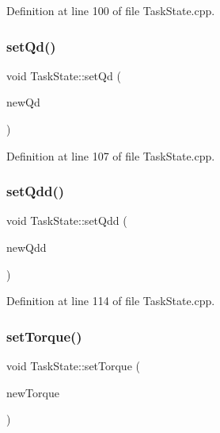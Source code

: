 Definition at line 100 of file Task\+State.\+cpp.

\hypertarget{classocra_1_1TaskState_a69d8a03ebd5c2c41e8108ff4b845ae49}{}\label{classocra_1_1TaskState_a69d8a03ebd5c2c41e8108ff4b845ae49} 
\subsubsection{\texorpdfstring{set\+Qd()}{setQd()}}
{\footnotesize\ttfamily void Task\+State\+::set\+Qd (\begin{DoxyParamCaption}\item[{const Eigen\+::\+Vector\+Xd \&}]{new\+Qd }\end{DoxyParamCaption})}



Definition at line 107 of file Task\+State.\+cpp.

\hypertarget{classocra_1_1TaskState_aa5e16bbe025ef970a18a12e0fe841c80}{}\label{classocra_1_1TaskState_aa5e16bbe025ef970a18a12e0fe841c80} 
\subsubsection{\texorpdfstring{set\+Qdd()}{setQdd()}}
{\footnotesize\ttfamily void Task\+State\+::set\+Qdd (\begin{DoxyParamCaption}\item[{const Eigen\+::\+Vector\+Xd \&}]{new\+Qdd }\end{DoxyParamCaption})}



Definition at line 114 of file Task\+State.\+cpp.

\hypertarget{classocra_1_1TaskState_a412f64cf9b8bc08186a83c5afda7cb7d}{}\label{classocra_1_1TaskState_a412f64cf9b8bc08186a83c5afda7cb7d} 
\subsubsection{\texorpdfstring{set\+Torque()}{setTorque()}}
{\footnotesize\ttfamily void Task\+State\+::set\+Torque (\begin{DoxyParamCaption}\item[{const Eigen\+::\+Vector\+Xd \&}]{new\+Torque }\end{DoxyParamCaption})}



